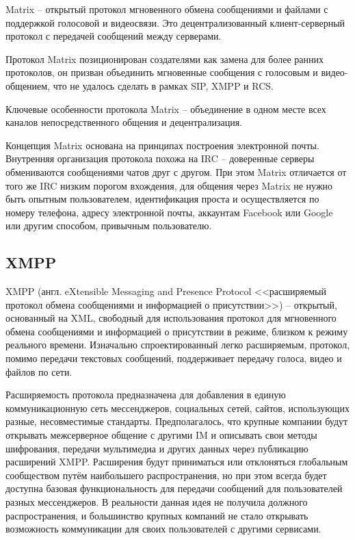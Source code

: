 Matrix \cite{matrix} -- открытый протокол мгновенного обмена сообщениями и файлами с поддержкой голосовой и видеосвязи. Это децентрализованный клиент-серверный протокол с передачей сообщений между серверами.

Протокол Matrix позиционирован создателями как замена для более ранних протоколов, он призван объединить мгновенные сообщения с голосовым и видео-общением, что не удалось сделать в рамках SIP, XMPP и RCS.

Ключевые особенности протокола Matrix -- объединение в одном месте всех каналов непосредственного общения и децентрализация.

Концепция Matrix основана на принципах построения электронной почты. Внутренняя организация протокола похожа на IRC -- доверенные серверы обмениваются сообщениями чатов друг с другом. При этом Matrix отличается от того же IRC низким порогом вхождения, для общения через Matrix не нужно быть опытным пользователем, идентификация проста и осуществляется по номеру телефона, адресу электронной почты, аккаунтам Facebook или Google или другим способом, привычным пользователю.

\subsection{XMPP}

XMPP \cite{xmpp} (англ. eXtensible Messaging and Presence Protocol <<расширяемый протокол обмена сообщениями и информацией о присутствии>>) -- открытый, основанный на XML, свободный для использования протокол для мгновенного обмена сообщениями и информацией о присутствии в режиме, близком к режиму реального времени. Изначально спроектированный легко расширяемым, протокол, помимо передачи текстовых сообщений, поддерживает передачу голоса, видео и файлов по сети.

Расширяемость протокола предназначена для добавления в единую коммуникационную сеть мессенджеров, социальных сетей, сайтов, использующих разные, несовместимые стандарты. Предполагалось, что крупные компании будут открывать межсерверное общение с другими IM и описывать свои методы шифрования, передачи мультимедиа и других данных через публикацию расширений XMPP. Расширения будут приниматься или отклоняться глобальным сообществом путём наибольшего распространения, но при этом всегда будет доступна базовая функциональность для передачи сообщений для пользователей разных мессенджеров. В реальности данная идея не получила должного распространения, и большинство крупных компаний не стало открывать возможность коммуникации для своих пользователей с другими сервисами.

